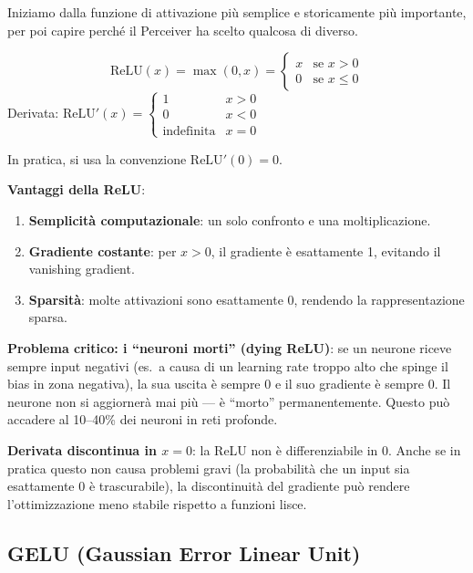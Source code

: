 \documentclass[12pt,a4paper]{article}
\begin{document}
Iniziamo dalla funzione di attivazione pi\`u semplice e storicamente pi\`u importante, per poi capire perch\'e il Perceiver ha scelto qualcosa di diverso.

\begin{formulabox}
\[
    \text{ReLU}(x) = \max(0, x) = \begin{cases} x & \text{se } x > 0 \\ 0 & \text{se } x \leq 0 \end{cases}
\]
Derivata: $\text{ReLU}'(x) = \begin{cases} 1 & x > 0 \\ 0 & x < 0 \\ \text{indefinita} & x = 0 \end{cases}$

In pratica, si usa la convenzione $\text{ReLU}'(0) = 0$.
\end{formulabox}

\textbf{Vantaggi della ReLU}:
\begin{enumerate}
    \item \textbf{Semplicit\`a computazionale}: un solo confronto e una moltiplicazione.
    \item \textbf{Gradiente costante}: per $x > 0$, il gradiente \`e esattamente 1, evitando il vanishing gradient.
    \item \textbf{Sparsit\`a}: molte attivazioni sono esattamente 0, rendendo la rappresentazione sparsa.
\end{enumerate}

\textbf{Problema critico: i ``neuroni morti'' (dying ReLU)}: se un neurone riceve sempre input negativi (es.\ a causa di un learning rate troppo alto che spinge il bias in zona negativa), la sua uscita \`e sempre 0 e il suo gradiente \`e sempre 0. Il neurone non si aggiorner\`a mai pi\`u --- \`e ``morto'' permanentemente. Questo pu\`o accadere al 10--40\% dei neuroni in reti profonde.

\textbf{Derivata discontinua in $x = 0$}: la ReLU non \`e differenziabile in 0. Anche se in pratica questo non causa problemi gravi (la probabilit\`a che un input sia esattamente 0 \`e trascurabile), la discontinuit\`a del gradiente pu\`o rendere l'ottimizzazione meno stabile rispetto a funzioni lisce.

\subsection{GELU (Gaussian Error Linear Unit)} \label{sec:gelu}
\end{document}
